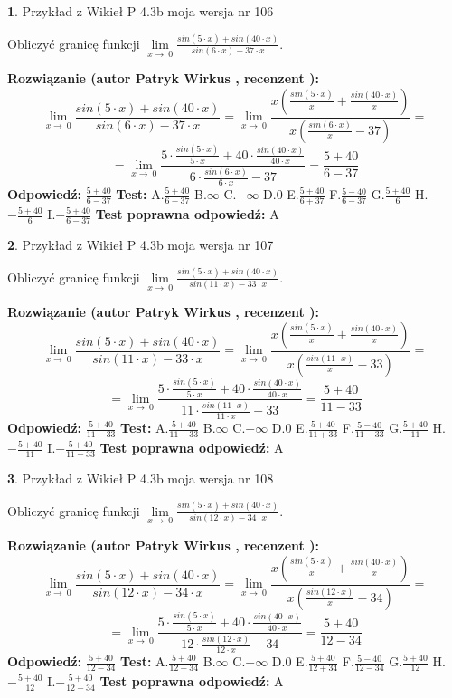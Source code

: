 \documentclass[12pt, a4paper]{article}
\theoremstyle{definition} %
\newtheorem{zad}{}
\newcommand{\zadStart}[1]{\begin{zad}#1\newline}
\newcommand{\zadStop}{\end{zad}}
\newcommand{\rozwStart}[2]{\noindent \textbf{Rozwiązanie (autor #1 , recenzent #2): }\newline}
\newcommand{\rozwStop}{\newline}
\newcommand{\odpStart}{\noindent \textbf{Odpowiedź:}\newline}
\newcommand{\odpStop}{\newline}
\newcommand{\testStart}{\noindent \textbf{Test:}\newline}
\newcommand{\testStop}{\newline}
\newcommand{\kluczStart}{\noindent \textbf{Test poprawna odpowiedź:}\newline}
\newcommand{\kluczStop}{\newline}
\begin{document}
\zadStart{Przykład z Wikieł P 4.3b moja wersja nr 106}


Obliczyć granicę funkcji $\lim\limits_{x\to\ 0}\frac{sin(5 \cdot x)+sin(40 \cdot x)}{sin(6 \cdot x)-37 \cdot x}$.
\zadStop
\rozwStart{Patryk Wirkus}{}
$$\lim\limits_{x\to\ 0}\frac{sin(5 \cdot x)+sin(40 \cdot x)}{sin(6 \cdot x)-37 \cdot x}=\lim\limits_{x\to\ 0}\frac{x(\frac{sin(5 \cdot x)}{x}+\frac{sin(40 \cdot x)}{x})}{x(\frac{sin(6 \cdot x)}{x}-37)}=$$
$$=\lim\limits_{x\to\ 0}\frac{5 \cdot \frac{sin(5 \cdot x)}{5 \cdot x}+40 \cdot \frac{sin(40 \cdot x)}{40 \cdot x}}{6 \cdot \frac{sin(6 \cdot x)}{6 \cdot x}-37}=\frac{5+40}{6-37}$$
\rozwStop
\odpStart
$\frac{5+40}{6-37}$
\odpStop
\testStart
A.$\frac{5+40}{6-37}$
B.$\infty$
C.$-\infty$
D.$0$
E.$\frac{5+40}{6+37}$
F.$\frac{5-40}{6-37}$
G.$\frac{5+40}{6}$
H.$-\frac{5+40}{6}$
I.$-\frac{5+40}{6-37}$
\testStop
\kluczStart
A
\kluczStop



\zadStart{Przykład z Wikieł P 4.3b moja wersja nr 107}


Obliczyć granicę funkcji $\lim\limits_{x\to\ 0}\frac{sin(5 \cdot x)+sin(40 \cdot x)}{sin(11 \cdot x)-33 \cdot x}$.
\zadStop
\rozwStart{Patryk Wirkus}{}
$$\lim\limits_{x\to\ 0}\frac{sin(5 \cdot x)+sin(40 \cdot x)}{sin(11 \cdot x)-33 \cdot x}=\lim\limits_{x\to\ 0}\frac{x(\frac{sin(5 \cdot x)}{x}+\frac{sin(40 \cdot x)}{x})}{x(\frac{sin(11 \cdot x)}{x}-33)}=$$
$$=\lim\limits_{x\to\ 0}\frac{5 \cdot \frac{sin(5 \cdot x)}{5 \cdot x}+40 \cdot \frac{sin(40 \cdot x)}{40 \cdot x}}{11 \cdot \frac{sin(11 \cdot x)}{11 \cdot x}-33}=\frac{5+40}{11-33}$$
\rozwStop
\odpStart
$\frac{5+40}{11-33}$
\odpStop
\testStart
A.$\frac{5+40}{11-33}$
B.$\infty$
C.$-\infty$
D.$0$
E.$\frac{5+40}{11+33}$
F.$\frac{5-40}{11-33}$
G.$\frac{5+40}{11}$
H.$-\frac{5+40}{11}$
I.$-\frac{5+40}{11-33}$
\testStop
\kluczStart
A
\kluczStop



\zadStart{Przykład z Wikieł P 4.3b moja wersja nr 108}


Obliczyć granicę funkcji $\lim\limits_{x\to\ 0}\frac{sin(5 \cdot x)+sin(40 \cdot x)}{sin(12 \cdot x)-34 \cdot x}$.
\zadStop
\rozwStart{Patryk Wirkus}{}
$$\lim\limits_{x\to\ 0}\frac{sin(5 \cdot x)+sin(40 \cdot x)}{sin(12 \cdot x)-34 \cdot x}=\lim\limits_{x\to\ 0}\frac{x(\frac{sin(5 \cdot x)}{x}+\frac{sin(40 \cdot x)}{x})}{x(\frac{sin(12 \cdot x)}{x}-34)}=$$
$$=\lim\limits_{x\to\ 0}\frac{5 \cdot \frac{sin(5 \cdot x)}{5 \cdot x}+40 \cdot \frac{sin(40 \cdot x)}{40 \cdot x}}{12 \cdot \frac{sin(12 \cdot x)}{12 \cdot x}-34}=\frac{5+40}{12-34}$$
\rozwStop
\odpStart
$\frac{5+40}{12-34}$
\odpStop
\testStart
A.$\frac{5+40}{12-34}$
B.$\infty$
C.$-\infty$
D.$0$
E.$\frac{5+40}{12+34}$
F.$\frac{5-40}{12-34}$
G.$\frac{5+40}{12}$
H.$-\frac{5+40}{12}$
I.$-\frac{5+40}{12-34}$
\testStop
\kluczStart
A
\kluczStop
\end{document}
